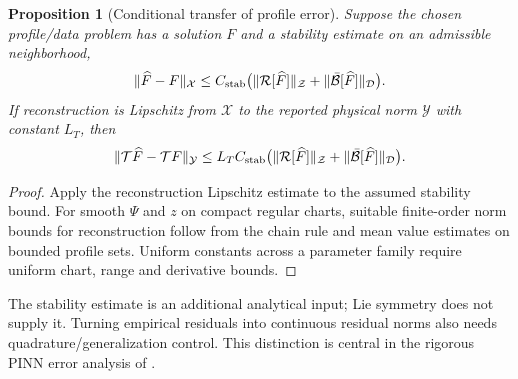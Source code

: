 \documentclass[11pt]{article}
\newtheorem{proposition}[theorem]{Proposition}
\theoremstyle{definition}
\begin{document}
\begin{proposition}[Conditional transfer of profile error]
\label{prop:error-transfer-core}
Suppose the chosen profile/data problem has a solution $F$ and a stability
estimate on an admissible neighborhood,
\[
 \|\widehat F-F\|_{\mathcal X}
 \le C_{\rm stab}\bigl(\|\mathcal R[\widehat F]\|_{\mathcal Z}
                       +\|\bar{\mathcal B}[\widehat F]\|_{\mathcal D}\bigr).
\]
If reconstruction is Lipschitz from $\mathcal X$ to the reported physical norm
$\mathcal Y$ with constant $L_T$, then
\begin{equation}
 \|\mathcal T\widehat F-\mathcal TF\|_{\mathcal Y}
 \le L_TC_{\rm stab}\bigl(\|\mathcal R[\widehat F]\|_{\mathcal Z}
                       +\|\bar{\mathcal B}[\widehat F]\|_{\mathcal D}\bigr).
 \label{eq:conditional-error-core}
\end{equation}
\end{proposition}
\begin{proof}
Apply the reconstruction Lipschitz estimate to the assumed stability bound.
For smooth $\Psi$ and $z$ on compact regular charts, suitable finite-order
norm bounds for reconstruction follow from the chain rule and mean value
estimates on bounded profile sets. Uniform constants across a parameter
family require uniform chart, range and derivative bounds.
\end{proof}
The stability estimate is an additional analytical input; Lie symmetry does
not supply it. Turning empirical residuals into continuous residual norms
also needs quadrature/generalization control. This distinction is central in
the rigorous PINN error analysis of \citet{mishra2023}.
\end{document}
